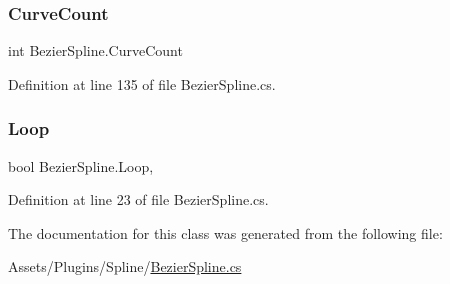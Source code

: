 \mbox{\label{class_bezier_spline_a953275346ac1b490473e3500c06b6286}} 
\subsubsection{\texorpdfstring{Curve\+Count}{CurveCount}}
{\footnotesize\ttfamily int Bezier\+Spline.\+Curve\+Count\hspace{0.3cm}{\ttfamily [get]}}



Definition at line 135 of file Bezier\+Spline.\+cs.

\mbox{\label{class_bezier_spline_a9b13fb8edeb86c6166fbd091b044eb63}} 
\subsubsection{\texorpdfstring{Loop}{Loop}}
{\footnotesize\ttfamily bool Bezier\+Spline.\+Loop\hspace{0.3cm}{\ttfamily [get]}, {\ttfamily [set]}}



Definition at line 23 of file Bezier\+Spline.\+cs.



The documentation for this class was generated from the following file\+:\begin{DoxyCompactItemize}
\item 
Assets/\+Plugins/\+Spline/\mbox{\hyperlink{_bezier_spline_8cs}{Bezier\+Spline.\+cs}}\end{DoxyCompactItemize}
